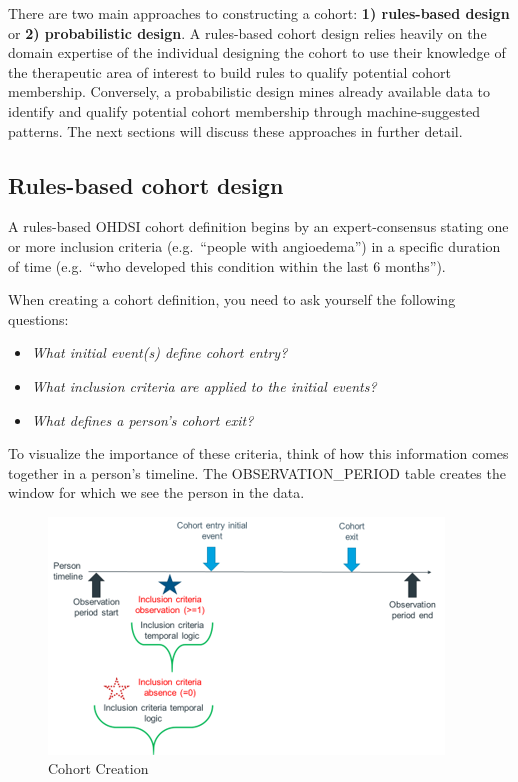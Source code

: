 \documentclass[11pt]{book}
\providecommand{\tightlist}{%
  \setlength{\itemsep}{0pt}\setlength{\parskip}{0pt}}
\theoremstyle{definition}
\theoremstyle{definition}
\theoremstyle{definition}
\theoremstyle{remark}
\begin{document}
There are two main approaches to constructing a cohort: \textbf{1) rules-based design} or \textbf{2) probabilistic design}. A rules-based cohort design relies heavily on the domain expertise of the individual designing the cohort to use their knowledge of the therapeutic area of interest to build rules to qualify potential cohort membership. Conversely, a probabilistic design mines already available data to identify and qualify potential cohort membership through machine-suggested patterns. The next sections will discuss these approaches in further detail.

\hypertarget{rules-based-cohort-design}{%
\subsection{Rules-based cohort design}\label{rules-based-cohort-design}}

A rules-based OHDSI cohort definition begins by an expert-consensus stating one or more inclusion criteria (e.g.~``people with angioedema'') in a specific duration of time (e.g.~``who developed this condition within the last 6 months'').

When creating a cohort definition, you need to ask yourself the following questions:

\begin{itemize}
\tightlist
\item
  \emph{What initial event(s) define cohort entry?}
\item
  \emph{What inclusion criteria are applied to the initial events?}
\item
  \emph{What defines a person's cohort exit?}
\end{itemize}

To visualize the importance of these criteria, think of how this information comes together in a person's timeline. The OBSERVATION\_PERIOD table creates the window for which we see the person in the data.

\begin{figure}
\includegraphics[width=1\linewidth]{images/Cohorts/cohort-build} \caption{Cohort Creation}\label{fig:cohortBuild}
\end{figure}
\end{document}
